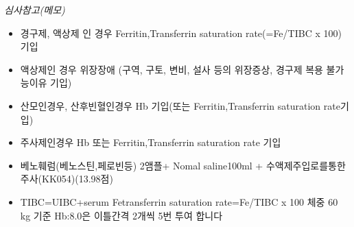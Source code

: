 \begin{commentbox}{}
\begin{shaded}
\emph{심사참고(메모)}
\begin{itemize}\tightlist
\item 경구제, 액상제 인 경우 Ferritin,Transferrin saturation rate(=Fe/TIBC x 100) 기입
\item 액상제인 경우 위장장애 (구역, 구토, 변비, 설사 등의 위장증상, 경구제 복용 불가능이유 기입)
\item 산모인경우, 산후빈혈인경우  Hb 기입(또는 Ferritin,Transferrin saturation rate기입)
\item 주사제인경우 Hb 또는 Ferritin,Transferrin saturation rate 기입
\end{itemize}
\end{shaded}
\end{commentbox}
\begin{itemize}\tightlist
\item 베노훼럼(베노스틴,페로빈등) 2앰플+ Nomal saline100ml + 수액제주입로를통한주사(KK054)(13.98점)
\item TIBC=UIBC+serum Fetransferrin saturation rate=Fe/TIBC x 100 \newline
체중 60 kg 기준 Hb:8.0은 이틀간격 2개씩 5번 투여 합니다
\end{itemize}

